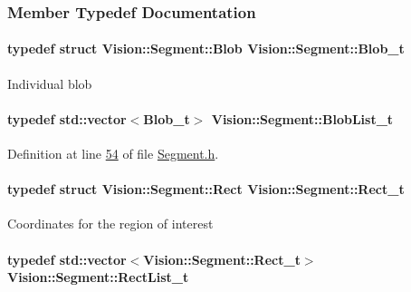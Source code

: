 \subsubsection{Member Typedef Documentation}
\hypertarget{class_vision_1_1_segment_add6c81230e499b159218c5232e3b76ae}{}
\paragraph[{Blob\+\_\+t}]{\setlength{\rightskip}{0pt plus 5cm}typedef struct {\bf Vision\+::\+Segment\+::\+Blob}  {\bf Vision\+::\+Segment\+::\+Blob\+\_\+t}}\label{class_vision_1_1_segment_add6c81230e499b159218c5232e3b76ae}
Individual blob \hypertarget{class_vision_1_1_segment_a60e08251e2ab94239e245044c31cde51}{}
\paragraph[{Blob\+List\+\_\+t}]{\setlength{\rightskip}{0pt plus 5cm}typedef std\+::vector$<${\bf Blob\+\_\+t}$>$ {\bf Vision\+::\+Segment\+::\+Blob\+List\+\_\+t}}\label{class_vision_1_1_segment_a60e08251e2ab94239e245044c31cde51}


Definition at line \hyperlink{_segment_8h_source_l00054}{54} of file \hyperlink{_segment_8h_source}{Segment.\+h}.

\hypertarget{class_vision_1_1_segment_af9428422a82edaab8a1e5ba59acc8c16}{}
\paragraph[{Rect\+\_\+t}]{\setlength{\rightskip}{0pt plus 5cm}typedef struct {\bf Vision\+::\+Segment\+::\+Rect}  {\bf Vision\+::\+Segment\+::\+Rect\+\_\+t}}\label{class_vision_1_1_segment_af9428422a82edaab8a1e5ba59acc8c16}
Coordinates for the region of interest \hypertarget{class_vision_1_1_segment_aaaa7a3b37f6fa4402bc1309e9bf74bec}{}
\paragraph[{Rect\+List\+\_\+t}]{\setlength{\rightskip}{0pt plus 5cm}typedef std\+::vector$<${\bf Vision\+::\+Segment\+::\+Rect\+\_\+t}$>$ {\bf Vision\+::\+Segment\+::\+Rect\+List\+\_\+t}}\label{class_vision_1_1_segment_aaaa7a3b37f6fa4402bc1309e9bf74bec}


